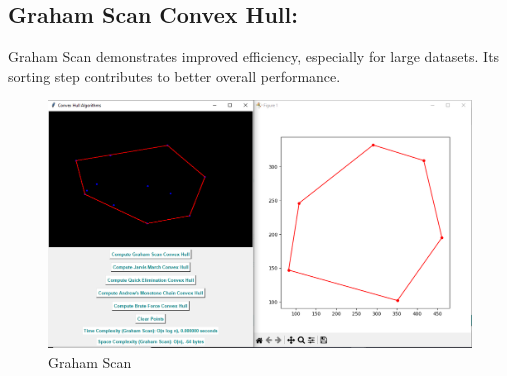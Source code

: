 \vspace{10pt}

\subsection{\textbf{Graham Scan Convex Hull:}}

Graham Scan demonstrates improved efficiency, especially for large datasets. Its sorting step contributes to better overall performance.

\begin{figure}[h]
    \centering
    \includegraphics[width=1\linewidth]{grahamscan.PNG}
    \caption{Graham Scan}
    \label{fig:grahamscan}
\end{figure}

\vspace{10pt}



